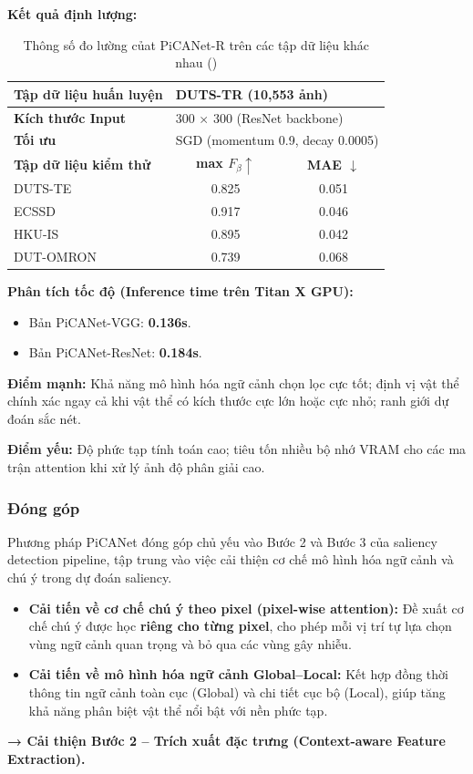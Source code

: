 \textbf{Kết quả định lượng:}
\begin{table}[H]
\centering
\caption{Thông số đo lường củat PiCANet-R trên các tập dữ liệu khác nhau (\cite{picanet_2018})}
\begin{tabular}{|l|c|c|}
\hline
\textbf{Tập dữ liệu huấn luyện} & \multicolumn{2}{l|}{DUTS-TR (10,553 ảnh)} \\ \hline
\textbf{Kích thước Input} & \multicolumn{2}{l|}{300 $\times$ 300 (ResNet backbone)} \\ \hline
\textbf{Tối ưu} & \multicolumn{2}{l|}{SGD (momentum 0.9, decay 0.0005)} \\ \hline
\hline
\textbf{Tập dữ liệu kiểm thử} & \textbf{max $F_{\beta} \uparrow$} & \textbf{MAE $\downarrow$} \\ \hline
DUTS-TE & 0.825 & 0.051 \\ \hline
ECSSD & 0.917 & 0.046 \\ \hline
HKU-IS & 0.895 & 0.042 \\ \hline
DUT-OMRON & 0.739 & 0.068 \\ \hline
\end{tabular}
\end{table}


\textbf{Phân tích tốc độ (Inference time trên Titan X GPU):}
\begin{itemize}
    \item Bản PiCANet-VGG: \textbf{0.136s}.
    \item Bản PiCANet-ResNet: \textbf{0.184s}.
\end{itemize}

\textbf{Điểm mạnh:} Khả năng mô hình hóa ngữ cảnh chọn lọc cực tốt; định vị vật thể chính xác ngay cả khi vật thể có kích thước cực lớn hoặc cực nhỏ; ranh giới dự đoán sắc nét.

\textbf{Điểm yếu:} Độ phức tạp tính toán cao; tiêu tốn nhiều bộ nhớ VRAM cho các ma trận attention khi xử lý ảnh độ phân giải cao.

\subsubsection{Đóng góp}
Phương pháp PiCANet đóng góp chủ yếu vào Bước 2 và Bước 3 của saliency detection pipeline, tập trung vào việc cải thiện cơ chế mô hình hóa ngữ cảnh và chú ý trong dự đoán saliency.

\begin{itemize}
    \item \textbf{Cải tiến về cơ chế chú ý theo pixel (pixel-wise attention):} Đề xuất cơ chế chú ý được học \textbf{riêng cho từng pixel}, cho phép mỗi vị trí tự lựa chọn vùng ngữ cảnh quan trọng và bỏ qua các vùng gây nhiễu.
    \item \textbf{Cải tiến về mô hình hóa ngữ cảnh Global–Local:} Kết hợp đồng thời thông tin ngữ cảnh toàn cục (Global) và chi tiết cục bộ (Local), giúp tăng khả năng phân biệt vật thể nổi bật với nền phức tạp.
\end{itemize}
\textbf{→ Cải thiện Bước 2 – Trích xuất đặc trưng (Context-aware Feature Extraction).}

